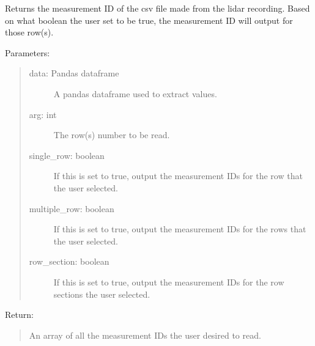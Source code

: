 \documentclass[letterpaper,10pt,english]{sphinxmanual}
\begin{document}
\begin{fulllineitems}
\label{\detokenize{Lidar extraction tool:lidar_extract.get_measurement_id}}
Returns the measurement ID of the csv file made from the lidar recording. Based on what boolean the user set to be true,
the measurement ID will output for those row(s).

Parameters:
\begin{quote}
\begin{description}
\item[{data: Pandas dataframe}] \leavevmode
A pandas dataframe used to extract values.

\item[{arg: int}] \leavevmode
The row(s) number to be read.

\item[{single\_row: boolean}] \leavevmode
If this is set to true, output the measurement IDs for the row that the user selected.

\item[{multiple\_row: boolean}] \leavevmode
If this is set to true, output the measurement IDs for the rows that the user selected.

\item[{row\_section: boolean}] \leavevmode
If this is set to true, output the measurement IDs for the row sections the user selected.

\end{description}
\end{quote}

Return:
\begin{quote}

An array of all the measurement IDs the user desired to read.
\end{quote}

\end{fulllineitems}

\end{document}

